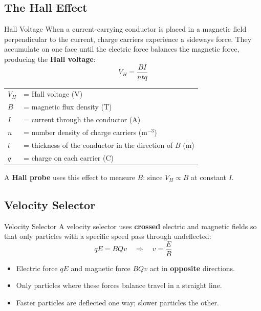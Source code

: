 \subsection{The Hall Effect}

\begin{definitionbox}{Hall Voltage}
When a current-carrying conductor is placed in a magnetic field perpendicular to the current, charge carriers experience a sideways force. They accumulate on one face until the electric force balances the magnetic force, producing the \textbf{Hall voltage}:
$$V_H = \frac{BI}{ntq}$$
\begin{tabular}{@{}ll@{}}
$V_H$ & = Hall voltage (V) \\
$B$ & = magnetic flux density (T) \\
$I$ & = current through the conductor (A) \\
$n$ & = number density of charge carriers (m$^{-3}$) \\
$t$ & = thickness of the conductor in the direction of $B$ (m) \\
$q$ & = charge on each carrier (C) \\
\end{tabular}
\vspace{0.3em}

A \textbf{Hall probe} uses this effect to measure $B$: since $V_H \propto B$ at constant $I$.
\end{definitionbox}

\subsection{Velocity Selector}

\begin{keybox}{Velocity Selector}
A velocity selector uses \textbf{crossed} electric and magnetic fields so that only particles with a specific speed pass through undeflected:
$$qE = BQv \quad \Rightarrow \quad v = \frac{E}{B}$$
\begin{itemize}[itemsep=2pt]
  \item Electric force $qE$ and magnetic force $BQv$ act in \textbf{opposite} directions.
  \item Only particles where these forces balance travel in a straight line.
  \item Faster particles are deflected one way; slower particles the other.
\end{itemize}
\end{keybox}

\pagebreak

